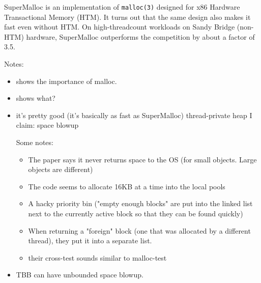 \documentclass[pldi]{sigplanconf-pldi15}
\begin{document}
SuperMalloc is an implementation of \texttt{malloc(3)} designed for
x86 Hardware Transactional Memory (HTM).  It turns out that the same
design also makes it fast even without HTM.  On high-threadcount
workloads on Sandy Bridge (non-HTM) hardware, SuperMalloc outperforms
the competition by about a factor of 3.5.

Notes: 
\begin{itemize}
\item \cite{ReinefeldDoSc13} shows the importance of malloc.
\item \cite{Dementiev09} shows what?
\item \cite{KukanovVo07}
 it's pretty good (it's basically as fast as SuperMalloc)
 thread-private heap
 I claim: space blowup

 Some notes:
 \begin{itemize}
   \item The paper says it never returns space to the OS (for small objects.  Large objects are different)
   \item The code seems to allocate 16KB at a time into the local pools
   \item A hacky priority bin ("empty enough blocks" are put into the linked list next to the currently active block so that they can be found quickly)
   \item When returning a "foreign" block (one that was allocated by a different thread), they put it into a separate list.
   \item their cross-test sounds similar to malloc-test
 \end{itemize}
\item \cite{Vyukov08} TBB can have unbounded space blowup.


\end{itemize}
\end{document}
